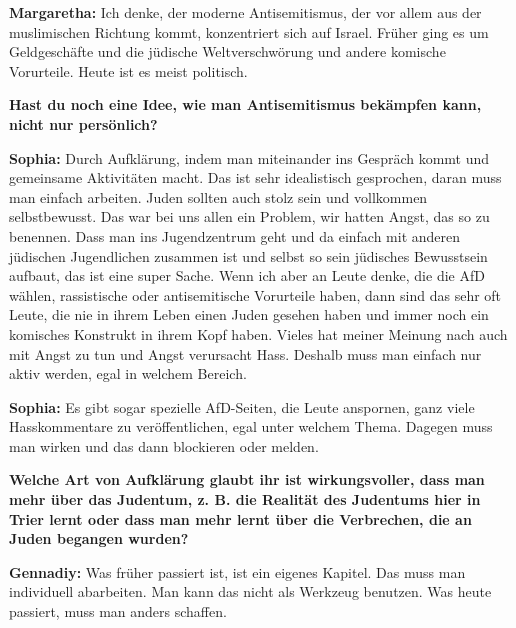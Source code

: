 \textbf{Margaretha:} Ich denke, der moderne Antisemitismus, der vor allem aus der muslimischen Richtung kommt, konzentriert sich auf Israel. Früher ging es um Geldgeschäfte und die jüdische Weltverschwörung und andere komische Vorurteile. Heute ist es meist politisch. 

\textbf{Hast du noch eine Idee, wie man Antisemitismus bekämpfen kann, nicht nur persönlich?} 

\textbf{Sophia:} Durch Aufklärung, indem man miteinander ins Gespräch kommt und gemeinsame Aktivitäten macht. Das ist sehr idealistisch gesprochen, daran muss man einfach arbeiten. Juden sollten auch stolz sein und vollkommen selbstbewusst. Das war bei uns allen ein Problem, wir hatten Angst, das so zu benennen. Dass man ins Jugendzentrum geht und da einfach mit anderen jüdischen Jugendlichen zusammen ist und selbst so sein jüdisches Bewusstsein aufbaut, das ist eine super Sache. Wenn ich aber an Leute denke, die die AfD wählen, rassistische oder antisemitische Vorurteile haben, dann sind das sehr oft Leute, die nie in ihrem Leben einen Juden gesehen haben und immer noch ein komisches Konstrukt in ihrem Kopf haben. Vieles hat meiner Meinung nach auch mit Angst zu tun und Angst verursacht Hass. Deshalb muss man einfach nur aktiv werden, egal in welchem Bereich.     
                                    
\textbf{Sophia:} Es gibt sogar spezielle AfD-Seiten, die Leute anspornen, ganz viele Hasskommentare zu veröffentlichen, egal unter welchem Thema. Dagegen muss man wirken und das dann blockieren oder melden. 

\textbf{Welche Art von Aufklärung glaubt ihr ist wirkungsvoller, dass man mehr über das Judentum, z. B. die Realität des Judentums hier in Trier lernt oder dass man mehr lernt über die Verbrechen, die an Juden begangen  wurden?}\par                                                 \textbf{Gennadiy:} Was früher passiert ist, ist ein eigenes Kapitel. Das muss man individuell abarbeiten. Man kann das nicht als Werkzeug benutzen. Was heute passiert, muss man anders schaffen. 